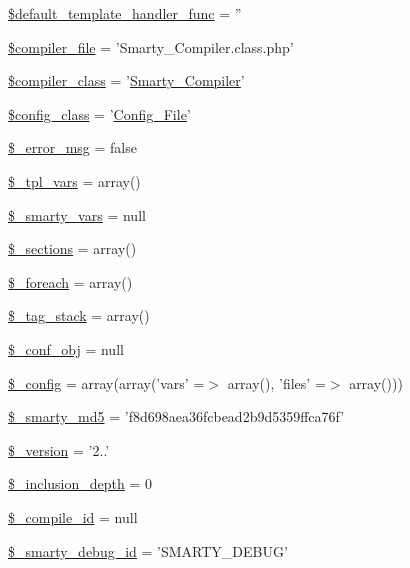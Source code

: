 \begin{DoxyCompactItemize}
\item 
\hyperlink{class_smarty_a9ff3231160bde6632ca8ad252918e3f0}{\$default\-\_\-template\-\_\-handler\-\_\-func} = ''
\item 
\hyperlink{class_smarty_a5912fff45f8fdf37cf48552ee9444323}{\$compiler\-\_\-file} = '\-Smarty\-\_\-\-Compiler.\-class.\-php'
\item 
\hyperlink{class_smarty_a7696818dcf593c5f9471d7f76ea2e645}{\$compiler\-\_\-class} = '\hyperlink{class_smarty___compiler}{\-Smarty\-\_\-\-Compiler}'
\item 
\hyperlink{class_smarty_a1ecdac7cb85b1aea3de21235de5db8d9}{\$config\-\_\-class} = '\hyperlink{class_config___file}{\-Config\-\_\-\-File}'
\item 
\hyperlink{class_smarty_a9936a2e534940a7b7e9c8b85b6966d83}{\$\-\_\-error\-\_\-msg} = false
\item 
\hyperlink{class_smarty_ac5b23df7404c26573f1d6efad81b9db9}{\$\-\_\-tpl\-\_\-vars} = array()
\item 
\hyperlink{class_smarty_a8b74cd5266386c9651f86d02b4bf3bc4}{\$\-\_\-smarty\-\_\-vars} = null
\item 
\hyperlink{class_smarty_a873245595639c46ba0a649d9d0abc018}{\$\-\_\-sections} = array()
\item 
\hyperlink{class_smarty_a1c8fbfed4c5eb0d511fe2d98bda8bc19}{\$\-\_\-foreach} = array()
\item 
\hyperlink{class_smarty_a8bc334635a0aa8e117a5e822ca71ee67}{\$\-\_\-tag\-\_\-stack} = array()
\item 
\hyperlink{class_smarty_a6c93acd86cae18c4630b272433b2e543}{\$\-\_\-conf\-\_\-obj} = null
\item 
\hyperlink{class_smarty_a4d4ad4af1600438042f93a4492f8dbbe}{\$\-\_\-config} = array(array('vars' =$>$ array(), 'files' =$>$ array()))
\item 
\hyperlink{class_smarty_a215c18c7e01e94ff276e0e7249bfd38d}{\$\-\_\-smarty\-\_\-md5} = 'f8d698aea36fcbead2b9d5359ffca76f'
\item 
\hyperlink{class_smarty_a01caaf3772469caf98e39064bf5d7d8f}{\$\-\_\-version} = '2..'
\item 
\hyperlink{class_smarty_a6167b63640563df2374a677f4ed41641}{\$\-\_\-inclusion\-\_\-depth} = 0
\item 
\hyperlink{class_smarty_ac327b0792184db847b78cae7da804eba}{\$\-\_\-compile\-\_\-id} = null
\item 
\hyperlink{class_smarty_a39de745821c96537c5f36d79120e1413}{\$\-\_\-smarty\-\_\-debug\-\_\-id} = '\-S\-M\-A\-R\-T\-Y\-\_\-\-D\-E\-B\-U\-G'

\end{DoxyCompactItemize}
